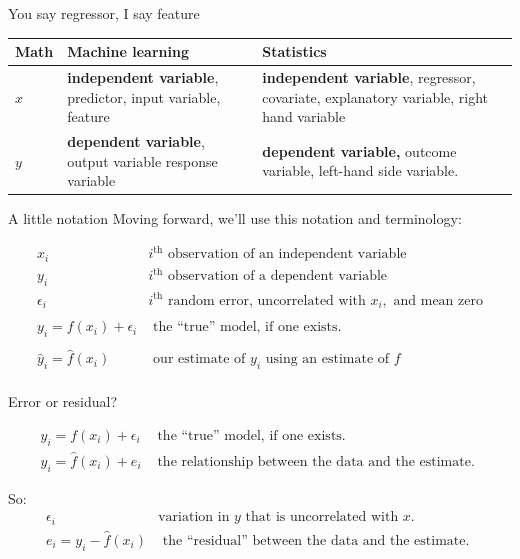 \documentclass[aspectratio=169]{beamer}
\begin{document}
\begin{frame}{You say regressor, I say feature}

\begin{table}[]
\begin{tabular}{lp{5.5cm}p{5.5cm}}
 \textbf{Math} & \textbf{Machine learning} & \textbf{Statistics}  \\
 \hline
 \hline
  $x$& \textbf{independent variable}, predictor, input variable, feature & \textbf{independent variable}, regressor, covariate,  explanatory variable, right hand variable \\
 $y$ &  \textbf{dependent variable}, output variable response variable & \textbf{dependent variable,} outcome variable, left-hand side variable.
\end{tabular}
\end{table}

\end{frame}


\begin{frame}{A little notation}
Moving forward, we'll use this notation and terminology:

\begin{eqnarray*}
x_i & i^\text{th} \text{ observation of an independent variable}\\
y_i & i^\text{th} \text{ observation of a dependent variable}\\
\epsilon_i & i^\text{th} \text{ random error, uncorrelated with }x_i,\text{ and mean zero}\\\\
y_i = f(x_i) + \epsilon_i & \text{ the ``true'' model, if one exists. }\\\\
\hat{y}_i = \hat{f}(x_i)  & \text{ our estimate of }y_i\text{ using an estimate of }f\\\end{eqnarray*}
\end{frame}

\begin{frame}{Error or residual?}

\begin{eqnarray*}
y_i = f(x_i) + \epsilon_i & \text{ the ``true'' model, if one exists. }\\
y_i = \hat{f}(x_i) + e_i & \text{ the relationship between the data and the estimate. }
\end{eqnarray*}

\hspace{5mm}
\pause

So:
\begin{eqnarray*}
\epsilon_i&\text{variation in $y$ that is uncorrelated with $x$.}\\
e_i = y_i - \hat{f}(x_i) & \text{ the ``residual'' between the data and the estimate. }
\end{eqnarray*}

\end{frame}
\end{document}
